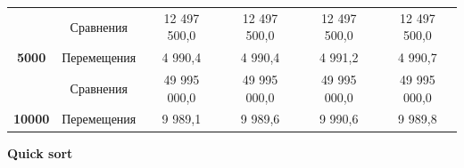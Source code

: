 \documentclass[a4paper,11pt]{article}
\begin{document}
\begin{table}[H]
\begin{tabular}{|c|c|c|c|c|c|}
        {\color[HTML]{3F3B42} }                                 & Сравнения                 & 12 497 500,0 & 12 497 500,0 & 12 497 500,0 & 12 497 500,0              \\ \cline{2-6} 
        \multirow{-2}{*}{{\color[HTML]{3F3B42} \textbf{5000}}}  & Перемещения               & 4 990,4      & 4 990,4      & 4 991,2      & 4 990,7                   \\ \hline
        {\color[HTML]{3F3B42} }                                 & Сравнения                 & 49 995 000,0 & 49 995 000,0 & 49 995 000,0 & 49 995 000,0              \\ \cline{2-6} 
        \multirow{-2}{*}{{\color[HTML]{3F3B42} \textbf{10000}}} & Перемещения               & 9 989,1      & 9 989,6      & 9 990,6      & 9 989,8                   \\ \hline
        \end{tabular}
    \end{table}
    \hspace{6,5 cm}\textbf{\Large{Quick sort }}
\end{document}
